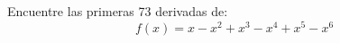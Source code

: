 \setcounter{enumi}{26}
\item Encuentre las primeras 73 derivadas de:
$$f(x) = x - x^2 + x^3 - x^4 + x^5 - x^6$$
